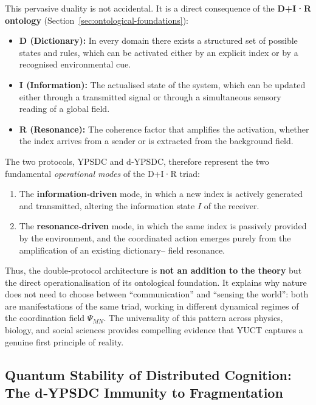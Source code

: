 \documentclass[11pt,a4paper]{article}
\begin{document}
\medskip
\noindent
This pervasive duality is not accidental. It is a direct consequence of the
\textbf{D+I·R ontology} (Section~\ref{sec:ontological-foundations}):
\begin{itemize}[leftmargin=*]
	\item \textbf{D (Dictionary):} In every domain there exists a structured
	set of possible states and rules, which can be activated either by an
	explicit index or by a recognised environmental cue.
	\item \textbf{I (Information):} The actualised state of the system, which
	can be updated either through a transmitted signal or through a
	simultaneous sensory reading of a global field.
	\item \textbf{R (Resonance):} The coherence factor that amplifies the
	activation, whether the index arrives from a sender or is extracted from
	the background field.
\end{itemize}

The two protocols, YPSDC and d‑YPSDC, therefore represent the two
fundamental \emph{operational modes} of the D+I·R triad:
\begin{enumerate}[leftmargin=*]
	\item The \textbf{information‑driven} mode, in which a new index is
	actively generated and transmitted, altering the information state
	\(I\) of the receiver.
	\item The \textbf{resonance‑driven} mode, in which the same index is
	passively provided by the environment, and the coordinated action
	emerges purely from the amplification of an existing dictionary–
	field resonance.
\end{enumerate}

Thus, the double‑protocol architecture is \textbf{not an addition to the
	theory} but the direct operationalisation of its ontological foundation.
It explains why nature does not need to choose between ``communication''
and ``sensing the world'': both are manifestations of the same triad,
working in different dynamical regimes of the coordination field
\(\Psi_{MN}\). The universality of this pattern across physics, biology,
and social sciences provides compelling evidence that YUCT captures a
genuine first principle of reality.

\subsection{Quantum Stability of Distributed Cognition: The d‑YPSDC Immunity to Fragmentation}
\label{subsec:quantum-stability-cognition}
\end{document}
